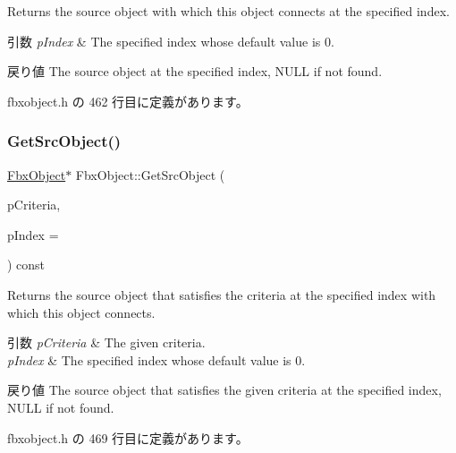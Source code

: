 Returns the source object with which this object connects at the specified index. 
\begin{DoxyParams}{引数}
{\em p\+Index} & The specified index whose default value is 0. \\
\hline
\end{DoxyParams}
\begin{DoxyReturn}{戻り値}
The source object at the specified index, N\+U\+LL if not found. 
\end{DoxyReturn}


 fbxobject.\+h の 462 行目に定義があります。

\mbox{\label{class_fbx_object_aff6aab5c2f62092af5a36d6720e3db25}} 
\subsubsection{\texorpdfstring{Get\+Src\+Object()}{GetSrcObject()}\hspace{0.1cm}{\footnotesize\ttfamily [2/4]}}
{\footnotesize\ttfamily \hyperlink{class_fbx_object}{Fbx\+Object}$\ast$ Fbx\+Object\+::\+Get\+Src\+Object (\begin{DoxyParamCaption}\item[{const \hyperlink{class_fbx_criteria}{Fbx\+Criteria} \&}]{p\+Criteria,  }\item[{int}]{p\+Index = {} }\end{DoxyParamCaption}) const\hspace{0.3cm}{\ttfamily [inline]}}

Returns the source object that satisfies the criteria at the specified index with which this object connects. 
\begin{DoxyParams}{引数}
{\em p\+Criteria} & The given criteria. \\
\hline
{\em p\+Index} & The specified index whose default value is 0. \\
\hline
\end{DoxyParams}
\begin{DoxyReturn}{戻り値}
The source object that satisfies the given criteria at the specified index, N\+U\+LL if not found. 
\end{DoxyReturn}


 fbxobject.\+h の 469 行目に定義があります。

\mbox{\label{class_fbx_object_a82874616164464f8b68c6ceeb78a45db}} 
